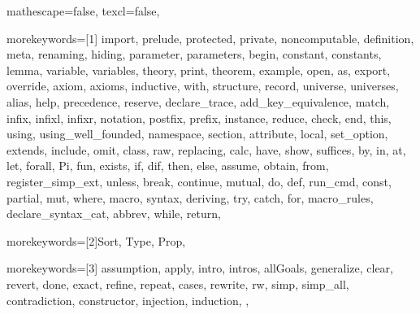 
 {

mathescape=false,
texcl=false,

morekeywords=[1]{
import, prelude, protected, private, noncomputable, definition, meta, renaming,
hiding, parameter, parameters, begin, constant, constants,
lemma, variable, variables, theory,
print, theorem, example,
open, as, export, override, axiom, axioms, inductive, with,
structure, record, universe, universes,
alias, help, precedence, reserve, declare_trace, add_key_equivalence,
match, infix, infixl, infixr, notation, postfix, prefix, instance,
reduce, check, end, this,
using, using_well_founded, namespace, section,
attribute, local, set_option, extends, include, omit, class,
raw, replacing,
calc, have, show, suffices, by, in, at, let, forall, Pi, fun,
exists, if, dif, then, else, assume, obtain, from, register_simp_ext, unless, break, continue,
mutual, do, def, run_cmd, const,
partial, mut, where, macro, syntax, deriving,
try, catch, for, macro_rules, declare_syntax_cat, abbrev,
while, return},

morekeywords=[2]{Sort, Type, Prop},

morekeywords=[3]{
assumption,
apply, intro, intros, allGoals,
generalize, clear, revert, done, exact,
refine, repeat, cases, rewrite, rw,
simp, simp_all, contradiction,
constructor, injection,
induction,
},


}
